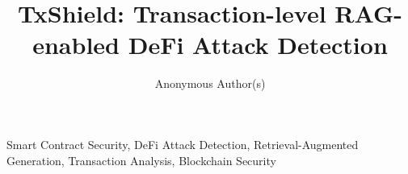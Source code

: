 \documentclass[journal,10pt]{IEEEtran}
\begin{document}
\title{TxShield: Transaction-level RAG-enabled DeFi Attack Detection}
\author{Anonymous Author(s)}
\maketitle

\begin{IEEEkeywords}
Smart Contract Security, DeFi Attack Detection, Retrieval-Augmented Generation, Transaction Analysis, Blockchain Security
\end{IEEEkeywords}











\end{document}
